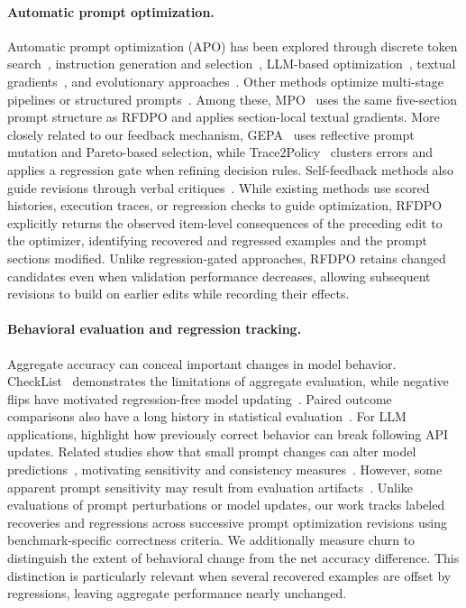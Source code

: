 \documentclass[11pt]{article}
\begin{document}
\paragraph{Automatic prompt optimization.}
Automatic prompt optimization (APO) has been explored through discrete token search~\citep{shin2020autoprompt}, instruction generation and selection~\citep{zhou2023ape}, LLM-based optimization~\citep{yang2024opro}, textual gradients~\citep{pryzant2023protegi,yuksekgonul2025textgrad}, and evolutionary approaches~\citep{guo2024evoprompt,fernando2024promptbreeder}. Other methods optimize multi-stage pipelines or structured prompts~\citep{opsahlong2024miprov2,schnabel2024sammo,khattab2024dspy}. Among these, MPO~\citep{sharma2026mpo} uses the same five-section prompt structure as RFDPO and applies section-local textual gradients. More closely related to our feedback mechanism, GEPA~\citep{agrawal2026gepa} uses reflective prompt mutation and Pareto-based selection, while Trace2Policy~\citep{zha2026trace2policy} clusters errors and applies a regression gate when refining decision rules. Self-feedback methods also guide revisions through verbal critiques~\citep{madaan2023selfrefine,shinn2023reflexion}. While existing methods use scored histories, execution traces, or regression checks to guide optimization, RFDPO explicitly returns the observed item-level consequences of the preceding edit to the optimizer, identifying recovered and regressed examples and the prompt sections modified. Unlike regression-gated approaches, RFDPO retains changed candidates even when validation performance decreases, allowing subsequent revisions to build on earlier edits while recording their effects.

\paragraph{Behavioral evaluation and regression tracking.}
Aggregate accuracy can conceal important changes in model behavior. CheckList~\citep{ribeiro2020checklist} demonstrates the limitations of aggregate evaluation, while negative flips have motivated regression-free model updating~\citep{yan2021positive}. Paired outcome comparisons also have a long history in statistical evaluation~\citep{mcnemar1947sampling}. For LLM applications, \citet{ma2024regression} highlight how previously correct behavior can break following API updates. Related studies show that small prompt changes can alter model predictions~\citep{salinas2024butterfly}, motivating sensitivity and consistency measures~\citep{errica2025wrong}. However, some apparent prompt sensitivity may result from evaluation artifacts~\citep{hua2025flaw}. Unlike evaluations of prompt perturbations or model updates, our work tracks labeled recoveries and regressions across successive prompt optimization revisions using benchmark-specific correctness criteria. We additionally measure churn to distinguish the extent of behavioral change from the net accuracy difference. This distinction is particularly relevant when several recovered examples are offset by regressions, leaving aggregate performance nearly unchanged.
\end{document}
